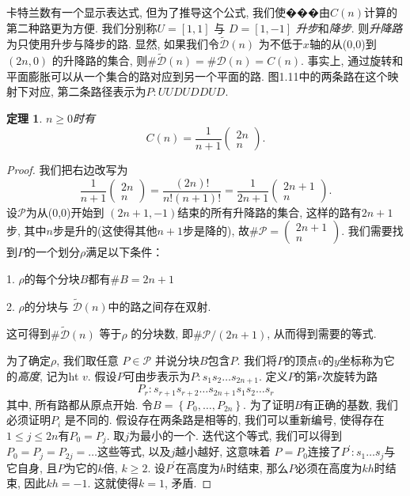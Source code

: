 \documentclass{ctexbook}
\newtheorem{thm}{定理}[section]
\begin{document}
卡特兰数有一个显示表达式, 但为了推导这个公式, 我们使���由$C(n)$计算的第二种路更为方便. 我们分别称$U=[1,1]$ 与 $D=[1,-1]$
\textsl{升步}和\textsl{降步}. 则\textsl{升降路}为只使用升步与降步的路. 显然, 如果我们令$\tilde{\mathcal{D}}(n)$
为不低于$x$轴的从(0,0)到$(2 n, 0)$ 的升降路的集合, 则$\# \tilde{\mathcal{D}}(n)=\# \mathcal{D}(n)=C(n)$. 事实上,
通过旋转和平面膨胀可以从一个集合的路对应到另一个平面的路. 图1.11中的两条路在这个映射下对应, 第二条路径表示为$P: U U D U D D U D$.
     \begin{thm}
    	$n \geqslant 0$时有
    	$$
    	C(n)=\frac{1}{n+1}\left(\begin{array}{c}
    	2 n \\ n
    	\end{array}\right).
    	$$
    \end{thm}
    \begin{proof}
    	我们把右边改写为
    	$$
    	\frac{1}{n+1}\left(\begin{array}{c}
    	2 n \\ n
    	\end{array}\right)=\frac{(2 n) !}{n !(n+1) !}=\frac{1}{2 n+1}\left(\begin{array}{c}
    	2 n+1 \\ n
    	\end{array}\right).
    	$$
    	设$\mathcal{P}$为从(0,0)开始到 $(2 n+1,-1)$结束的所有升降路的集合, 这样的路有$2 n+1$步, 其中$n$步是升的(这使得其他$n+1$步是降的),
    	故$\# \mathcal{P}=\left(\begin{array}{c}2 n+1 \\ n\end{array}\right)$. 我们需要找到$P$的一个划分$\rho$满足以下条件：

    	1. $\rho$的每个分块$B$都有$\# B=2 n+1$

    	2. $\rho$的分块与 $\tilde{\mathcal{D}}(n)$中的路之间存在双射.

    	\noindent
    	这可得到$\# \tilde{\mathcal{D}}(n)$ 等于$\rho$ 的分块数, 即$\# \mathcal{P} /(2 n+1)$, 从而得到需要的等式.

    	为了确定$\rho$, 我们取任意 $P \in \mathcal{P}$ 并说分块$B$包含$P$. 我们将$P$的顶点$v$的$y$坐标称为它的\textsl{高度}, 记为ht $v$.
    	假设$P$可由步表示为$P: s_{1} s_{2} \ldots s_{2 n+1}$. 定义$P$的第$r$次旋转为路
    	$$
    	P_{r}: s_{r+1} s_{r+2} \ldots s_{2 n+1} s_{1} s_{2} \ldots s_{r}
    	$$
    	其中, 所有路都从原点开始. 令$B=\left\{P_{0}, \ldots, P_{2 n}\right\}$. 为了证明$B$有正确的基数, 我们必须证明$P_{i}$
    	是不同的. 假设存在两条路是相等的, 我们可以重新编号, 使得存在$1 \leqslant j \leqslant 2 n$有$P_{0}=P_{j}$.
    	取$j$为最小的一个. 迭代这个等式, 我们可以得到 $P_{0}=P_{j}=P_{2 j}=\ldots$这些等式, 以及$j$越小越好, 这意味着
    	$P=P_{0}$连接了$P^{\prime}: s_{1} \ldots s_{j}$与它自身, 且$P$为它的$k$倍, $k \geqslant 2$. 设$P^{\prime}$在高度为$h$时结束, 那么$P$必须在高度为$kh$时结束,
    	因此$k h=-1$. 这就使得$k=1$, 矛盾.


\end{proof}
\end{document}
